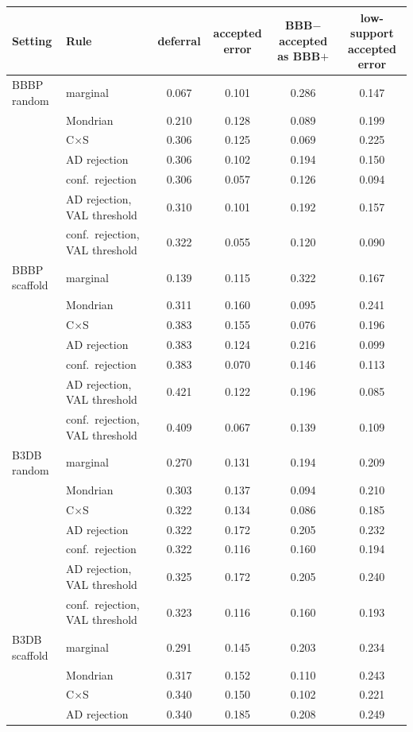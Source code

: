 \begin{tabular}{llcccc}
\toprule
Setting & Rule & deferral & accepted error & BBB$-$ accepted as BBB$+$ & low-support accepted error\\
\midrule
BBBP random & marginal & 0.067 & 0.101 & 0.286 & 0.147\\
 & Mondrian & 0.210 & 0.128 & 0.089 & 0.199\\
 & C$\times$S & 0.306 & 0.125 & 0.069 & 0.225\\
 & AD rejection & 0.306 & 0.102 & 0.194 & 0.150\\
 & conf.\ rejection & 0.306 & 0.057 & 0.126 & 0.094\\
 & AD rejection, VAL threshold & 0.310 & 0.101 & 0.192 & 0.157\\
 & conf.\ rejection, VAL threshold & 0.322 & 0.055 & 0.120 & 0.090\\
\midrule
BBBP scaffold & marginal & 0.139 & 0.115 & 0.322 & 0.167\\
 & Mondrian & 0.311 & 0.160 & 0.095 & 0.241\\
 & C$\times$S & 0.383 & 0.155 & 0.076 & 0.196\\
 & AD rejection & 0.383 & 0.124 & 0.216 & 0.099\\
 & conf.\ rejection & 0.383 & 0.070 & 0.146 & 0.113\\
 & AD rejection, VAL threshold & 0.421 & 0.122 & 0.196 & 0.085\\
 & conf.\ rejection, VAL threshold & 0.409 & 0.067 & 0.139 & 0.109\\
\midrule
B3DB random & marginal & 0.270 & 0.131 & 0.194 & 0.209\\
 & Mondrian & 0.303 & 0.137 & 0.094 & 0.210\\
 & C$\times$S & 0.322 & 0.134 & 0.086 & 0.185\\
 & AD rejection & 0.322 & 0.172 & 0.205 & 0.232\\
 & conf.\ rejection & 0.322 & 0.116 & 0.160 & 0.194\\
 & AD rejection, VAL threshold & 0.325 & 0.172 & 0.205 & 0.240\\
 & conf.\ rejection, VAL threshold & 0.323 & 0.116 & 0.160 & 0.193\\
\midrule
B3DB scaffold & marginal & 0.291 & 0.145 & 0.203 & 0.234\\
 & Mondrian & 0.317 & 0.152 & 0.110 & 0.243\\
 & C$\times$S & 0.340 & 0.150 & 0.102 & 0.221\\
 & AD rejection & 0.340 & 0.185 & 0.208 & 0.249\\

\end{tabular}
